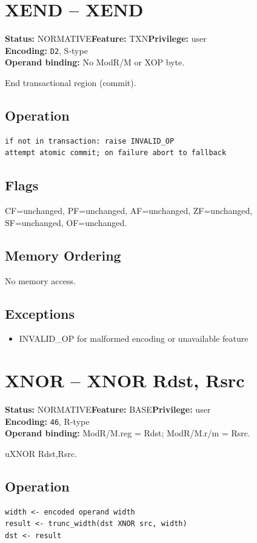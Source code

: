 \documentclass[10pt]{article}
\begin{document}
\section{XEND -- XEND}
\textbf{Status:} NORMATIVE\quad \textbf{Feature:} TXN\quad \textbf{Privilege:} user\\
\textbf{Encoding:} \texttt{D2}, S-type\\
\textbf{Operand binding:} No ModR/M or XOP byte.

End transactional region (commit).

\subsection*{Operation}
\begin{lstlisting}
if not in transaction: raise INVALID_OP
attempt atomic commit; on failure abort to fallback
\end{lstlisting}
\subsection*{Flags}
CF=unchanged, PF=unchanged, AF=unchanged, ZF=unchanged, SF=unchanged, OF=unchanged.
\subsection*{Memory Ordering}
No memory access.
\subsection*{Exceptions}
\begin{itemize}
\item INVALID\_OP for malformed encoding or unavailable feature
\end{itemize}
\clearpage

\section{XNOR -- XNOR Rdst, Rsrc}
\textbf{Status:} NORMATIVE\quad \textbf{Feature:} BASE\quad \textbf{Privilege:} user\\
\textbf{Encoding:} \texttt{46}, R-type\\
\textbf{Operand binding:} ModR/M.reg = Rdst; ModR/M.r/m = Rsrc.

uXNOR Rdst,Rsrc.

\subsection*{Operation}
\begin{lstlisting}
width <- encoded operand width
result <- trunc_width(dst XNOR src, width)
dst <- result
\end{lstlisting}
\end{document}
